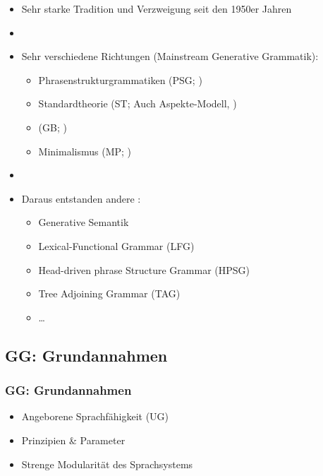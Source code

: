 \begin{frame}

\begin{itemize}
	\item Sehr starke Tradition und Verzweigung seit den 1950er Jahren
	\item[]
	\item Sehr verschiedene Richtungen (Mainstream Generative Grammatik):
	\begin{itemize}
		\item Phrasenstrukturgrammatiken (PSG; \citealt{Chomsky57a})
		\item Standardtheorie (ST; Auch Aspekte-Modell, \citealt{Chomsky65a})
		\item {} (GB; \citealt{Chomsky81a})
		\item Minimalismus (MP; \citealt{Chomsky95a})
	\end{itemize}
	\item[]
	\item Daraus entstanden andere :
	\begin{itemize}
		\item Generative Semantik \citep{Harris93a}
		\item Lexical-Functional Grammar (LFG)
		\item Head-driven phrase Structure Grammar (HPSG)
		\item Tree Adjoining Grammar (TAG)
		\item \dots
	\end{itemize}
\end{itemize}

\citep[vgl.][]{MuellerS15b}

\end{frame}


\subsection{GG: Grundannahmen}


\begin{frame}
\frametitle{GG: Grundannahmen}

\begin{itemize}
	\item Angeborene Sprachfähigkeit (UG)
	\item Prinzipien \& Parameter
	\item Strenge Modularität des Sprachsystems 
\end{itemize}

\end{frame}

